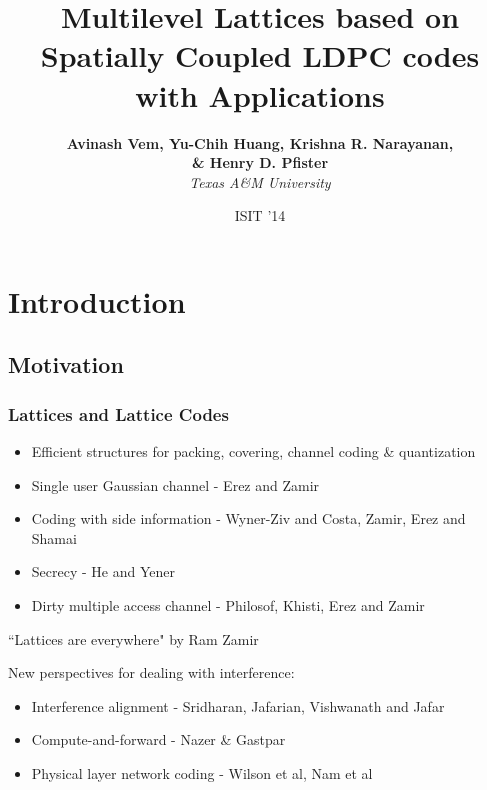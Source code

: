 \documentclass[10pt]{beamer}
\begin{document}
\title{\bf Multilevel Lattices based on Spatially Coupled LDPC codes with Applications}
\author{{\bf Avinash Vem,  \bf Yu-Chih Huang,  \bf Krishna R. Narayanan, \\ \& Henry D. Pfister} \\ \vspace{2pt} \textit{Texas A\&M University}}

\date{ISIT '14} %
\frame{\titlepage}


\section{Introduction}
\subsection{Motivation}
\begin{frame}\frametitle{Lattices and Lattice Codes}


    		\begin{itemize}
    		 \item Efficient structures for packing, covering, channel coding \& quantization
            \item Single user Gaussian channel - Erez and Zamir
			\item Coding with side information - Wyner-Ziv and Costa, Zamir, Erez and Shamai
			\item Secrecy - He and Yener
			\item Dirty multiple access channel - Philosof, Khisti, Erez and Zamir
	\end{itemize}
	
``Lattices are everywhere" by Ram Zamir
\end{frame}

\begin{frame}

New perspectives for dealing with interference:
      \begin{itemize}
     		\item<1-> Interference alignment - Sridharan, Jafarian, Vishwanath and Jafar
			\item<2-> Compute-and-forward - Nazer \& Gastpar
			\item<2-> Physical layer network coding - Wilson et al, Nam et al
      \end{itemize}
			\vspace{2.5em}
			
	\begin{figure}
		\centering
	\end{figure}
\end{frame}  
\end{document}
